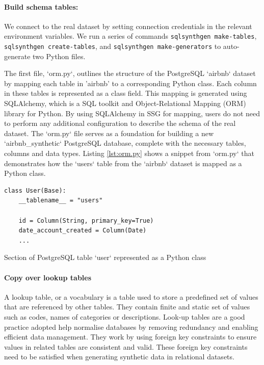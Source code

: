 \documentclass[11pt]{article}
\begin{document}
\paragraph{Build schema tables:}
We connect to the real dataset by setting connection credentials in the relevant environment variables. We run a series of commands \texttt{sqlsynthgen make-tables}, \texttt{sqlsynthgen create-tables}, and \texttt{sqlsynthgen make-generators} to auto-generate two Python files. 

The first file, `orm.py`, outlines the structure of the PostgreSQL `airbnb` dataset by mapping each table in 'airbnb' to a corresponding Python class. Each column in these tables is represented as a class field. This mapping is generated using SQLAlchemy\cite{sqlalchemy}, which is a SQL toolkit and Object-Relational Mapping (ORM) library for Python. By using SQLAlchemy in SSG for mapping, users do not need to perform any additional configuration to describe the schema of the real dataset. The `orm.py` file serves as a foundation for building a new `airbnb\_synthetic` PostgreSQL database, complete with the necessary tables, columns and data types. Listing \ref{lst:orm.py} shows a snippet from `orm.py` that demonstrates how the  `users` table from the `airbnb`  dataset is mapped as a Python class.

\begin{listing}[H]
\begin{verbatim}
class User(Base):
    __tablename__ = "users"

    id = Column(String, primary_key=True)
    date_account_created = Column(Date)
    ...
\end{verbatim}
\caption{Section of PostgreSQL table `user` represented as a Python class}
\label{lst:orm.py}
\end{listing}

\paragraph{Copy over lookup tables}

A lookup table, or a vocabulary is a table used to store a predefined set of values that are referenced by other tables. They contain finite and static set of values such as codes, names of categories or descriptions. Look-up tables are a good practice adopted help normalise databases by removing redundancy and enabling efficient data management. They work by using foreign key constraints to ensure values in related tables are consistent and valid. These foreign key constraints need to be satisfied when generating synthetic data in relational datasets.  
\end{document}
